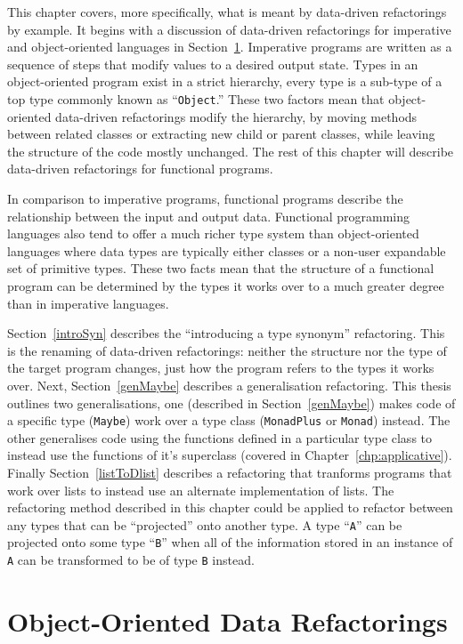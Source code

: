 This chapter covers, more specifically, what is meant by data-driven refactorings by example. It begins with a discussion of data-driven refactorings for imperative and object-oriented languages in Section~\ref{ooRefs}. Imperative programs are written as a sequence of steps that modify values to a desired output state. Types in an object-oriented program exist in a strict hierarchy, every type is a sub-type of a top type commonly known as ``\texttt{Object}.'' These two factors mean that object-oriented data-driven refactorings modify the hierarchy, by moving methods between related classes or extracting new child or parent classes, while leaving the structure of the code mostly unchanged. The rest of this chapter will describe data-driven refactorings for functional programs.

In comparison to imperative programs, functional programs describe the relationship between the input and output data. Functional programming languages also tend to offer a much richer type system than object-oriented languages where data types are typically either classes or a non-user expandable set of primitive types. These two facts mean that the structure of a functional program can be determined by the types it works over to a much greater degree than in imperative languages.

Section~\ref{introSyn} describes the ``introducing a type synonym'' refactoring. This is the renaming of data-driven refactorings: neither the structure nor the type of the target program changes, just how the program refers to the types it works over. Next, Section~\ref{genMaybe} describes a generalisation refactoring. This thesis outlines two generalisations, one (described in Section~\ref{genMaybe}) makes code of a specific type (\texttt{Maybe}) work over a type class (\texttt{MonadPlus} or \texttt{Monad}) instead. The other generalises code using the functions defined in a particular type class to instead use the functions of it's superclass (covered in Chapter~\ref{chp:applicative}). Finally Section~\ref{listToDlist} describes a refactoring that tranforms programs that work over lists to instead use an alternate implementation of lists. The refactoring method described in this chapter could be applied to refactor between any types that can be ``projected'' onto another type. A type ``\texttt{A}'' can be projected onto some type ``\texttt{B}'' when all of the information stored in an instance of \texttt{A} can be transformed to be of type \texttt{B} instead. 

\section{Object-Oriented Data Refactorings}\label{ooRefs}

